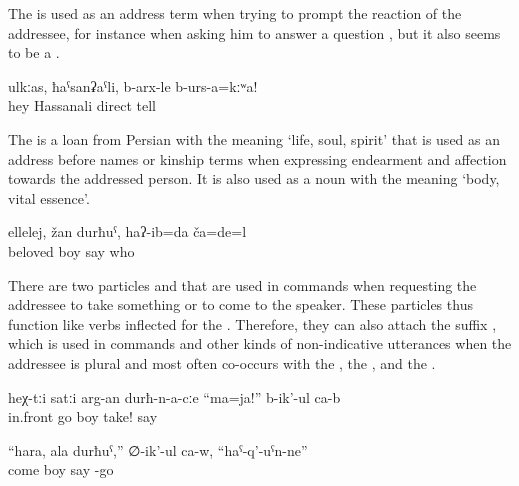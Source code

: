 The   is used as an address term when trying to prompt the reaction of the addressee, for instance when asking him to answer a question , but it also seems to be a . 


\begin{exe}
	\ex	\label{ex:Hey, Hasanali, tell the truth minor}
	\gll	ulkːas,	ħaˁsanʡaˁli,	b-arx-le	b-urs-a=kːʷa!\\
		hey	Hassanali	direct	tell\\
	\glt	{}
\end{exe}

The    is a loan from Persian with the meaning `life, soul, spirit' that is used as an address  before names or kinship terms when expressing endearment and affection towards the addressed person. It is also used as a noun with the meaning `body, vital essence'.

\begin{exe}
	\ex	\label{ex:‎Ooh, my dear boy, I thought, who are you minor}
	\gll	ellelej,	žan	durħuˁ,	haʔ-ib=da	ča=de=l\\
		 beloved	boy	say	who\\
	\glt	{}
\end{exe}

There are two particles  	and   that are used in commands when requesting the addressee to take something or to come to the speaker. These particles thus function like verbs inflected for the . Therefore, they can also attach the suffix  , which is used in commands and other kinds of non-indicative utterances when the addressee is plural and most often co-occurs with the , the , and the .

\begin{exe}
	\ex	\label{ex:‎They say to the guys passing by, Take (a drink) minor}
	\gll	heχ-tːi		satːi	arg-an	durħ-n-a-cːe	``ma=ja!''		b-ik'-ul	ca-b\\
			in.front	go	boy	take!	say	\\
	\glt	{}

	\ex	\label{ex:‎Come, you son is arriving, he says minor}
	\gll	``hara,	ala	durħuˁ,''	∅-ik'-ul	ca-w,	``haˁ-q'-uˁn-ne''\\
		come		boy	say		-go\\
	\glt	{}
\end{exe}	

